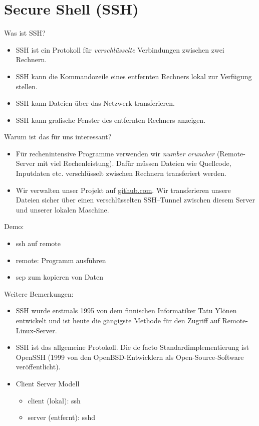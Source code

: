 \section{Secure Shell (SSH)}
Was ist SSH?
\begin{itemize}
	\item SSH ist ein Protokoll für \textit{verschlüsselte} Verbindungen zwischen zwei Rechnern.
	\item SSH kann die Kommandozeile eines entfernten Rechners lokal zur Verfügung stellen.
	\item SSH kann Dateien über das Netzwerk transferieren.
	\item SSH kann grafische Fenster des entfernten Rechners anzeigen.
\end{itemize}
Warum ist das für uns interessant?
\begin{itemize}
	\item Für rechenintensive Programme verwenden wir \textit{number cruncher} (Remote-Server mit viel Rechenleistung). Dafür müssen Dateien wie Quellcode, Inputdaten etc. verschlüsselt zwischen Rechnern transferiert werden.
	\item Wir verwalten unser Projekt auf \url{github.com}. Wir transferieren unsere Dateien sicher über einen verschlüsselten SSH--Tunnel zwischen diesem Server und unserer lokalen Maschine.
\end{itemize}
Demo:
\begin{itemize}
	\item  ssh auf remote
	\item remote: Programm ausführen
	\item scp zum kopieren von Daten
\end{itemize}
Weitere Bemerkungen:
\begin{itemize}
	\item SSH wurde erstmals 1995 von dem finnischen Informatiker Tatu Ylönen entwickelt und ist heute die gängigste Methode für den Zugriff auf Remote-Linux-Server.
	\item SSH ist das allgemeine Protokoll. Die de facto Standardimplementierung ist OpenSSH (1999 von den OpenBSD-Entwicklern als Open-Source-Software veröffentlicht).
	\item Client Server Modell
	      \begin{itemize}
		      \item client (lokal): ssh
		      \item server (entfernt): sshd
	      \end{itemize}
\end{itemize}
